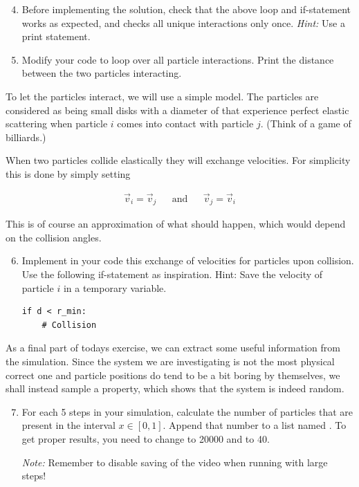 \documentclass{article}
\begin{document}
\begin{enumerate}
  \setcounter{enumi}{3}
  \item Before implementing the solution, check that the above loop and
      if-statement works as expected, and checks all unique interactions only once. 
      {\em Hint:} Use a print statement.

  \item Modify your code to loop over all particle interactions. Print the
    distance between the two particles interacting.

\end{enumerate}

To let the particles interact, we will use a simple model. The
particles are considered as being small disks with a diameter of  that experience
perfect elastic scattering when particle $i$ comes into contact with particle $j$.
(Think of a game of billiards.)

When two particles collide elastically they will exchange velocities.
For simplicity this is done by simply setting

\begin{align}
  \vec{v}_i = \vec{v}_j & & \text{and} & & \vec{v}_j = \vec{v}_i
\end{align}

This is of course an approximation of what should happen, which would depend on the collision angles.

\begin{enumerate}
  \setcounter{enumi}{5}
  \item Implement in your code this exchange of velocities for particles upon
    collision. Use the following if-statement as inspiration.
    {Hint:} Save the velocity of particle $i$ in a temporary variable.

\begin{lstlisting}
if d < r_min:
    # Collision
\end{lstlisting}

\end{enumerate}

As a final part of todays exercise, we can extract some useful information from the simulation.
Since the system we are investigating is not the most physical correct one and
particle positions do tend to be a bit boring by themselves, we shall instead
sample a property, which shows that the system is indeed random.

\begin{enumerate}
  \setcounter{enumi}{6}
  \item For each 5 steps in your simulation, calculate the number of particles
    that are present in the interval $x \in [0, 1]$.
    Append that number to a list named .  To get proper results,
    you need to change  to 20000 and  to 40.

    {\em Note:} Remember to disable saving of the video when running with large
    steps!

\end{enumerate}
\end{document}
